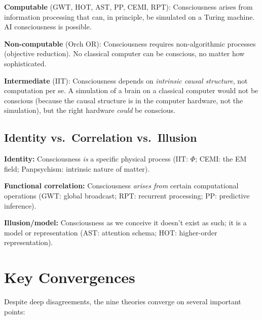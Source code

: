 \documentclass[11pt,a4paper]{report}
\begin{document}
\begin{divergebox}
\textbf{Computable} (GWT, HOT, AST, PP, CEMI, RPT): Consciousness arises from information processing that can, in principle, be simulated on a Turing machine. AI consciousness is possible.

\textbf{Non-computable} (Orch OR): Consciousness requires non-algorithmic processes (objective reduction). No classical computer can be conscious, no matter how sophisticated.

\textbf{Intermediate} (IIT): Consciousness depends on \emph{intrinsic causal structure}, not computation per se. A simulation of a brain on a classical computer would not be conscious (because the causal structure is in the computer hardware, not the simulation), but the right hardware \emph{could} be conscious.
\end{divergebox}

\section{Identity vs.\ Correlation vs.\ Illusion}

\begin{divergebox}
\textbf{Identity:} Consciousness \emph{is} a specific physical process (IIT: $\Phi$; CEMI: the EM field; Panpsychism: intrinsic nature of matter).

\textbf{Functional correlation:} Consciousness \emph{arises from} certain computational operations (GWT: global broadcast; RPT: recurrent processing; PP: predictive inference).

\textbf{Illusion/model:} Consciousness as we conceive it doesn't exist as such; it is a model or representation (AST: attention schema; HOT: higher-order representation).
\end{divergebox}


\chapter{Key Convergences}

Despite deep disagreements, the nine theories converge on several important points:
\end{document}
